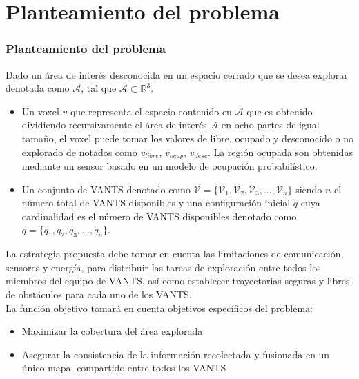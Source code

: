 \documentclass[
  24pt, %
  aspectratio=169, %
]{beamer}
\begin{document}
\section{Planteamiento del problema}
\begin{frame}
  \frametitle{Planteamiento del problema}
  \justifying
  \scriptsize Dado un área de interés desconocida en un espacio cerrado que se desea explorar denotada como $\mathcal{A}$, tal que $\mathcal{A} \subset \mathbb{R}^{3}$.\\

  \begin{itemize}
  \item Un voxel $v$ que representa el espacio contenido en $\mathcal{A}$ que es obtenido dividiendo recursivamente el área de interés $\mathcal{A}$ en ocho partes de igual tamaño, el voxel puede tomar los valores de libre, ocupado y desconocido o no explorado de notados como $v_{libre}$, $v_{ocup}$, $v_{desc}$. La región ocupada son obtenidas mediante un sensor basado en un modelo de ocupación probabilístico.\\
  \item Un conjunto de VANTS denotado como $\mathcal{V} = \{\mathcal{V}_{1},\mathcal{V}_{2},\mathcal{V}_{3},...,\mathcal{V}_{n}\}$ siendo $n$ el número total de VANTS disponibles y una configuración inicial $q$ cuya cardinalidad es el número de VANTS disponibles denotado como $q = \{q_{1},q_{2},q_{3},...,q_{n}\}$.\\
  \end{itemize}
  \bigskip %
  La estrategia propuesta debe tomar en cuenta las limitaciones de comunicación, sensores y energía, para distribuir las tareas de exploración entre todos los miembros del equipo de VANTS, así como establecer trayectorias seguras y libres de obstáculos para cada uno de los VANTS.\\
  

  \bigskip %
  La funci\'{o}n objetivo tomar\'{a} en cuenta objetivos espec\'{i}ficos del problema:
  \begin{itemize}
  \item Maximizar la cobertura del \'{a}rea explorada 
  \item Asegurar la consistencia de la información recolectada y fusionada en un único mapa, compartido entre todos los VANTS
  \end{itemize}
  

\end{frame}
\end{document}
